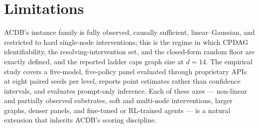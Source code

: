 \section{Limitations}
\label{sec:limitations}

ACDB's instance family is fully observed, causally sufficient, linear--Gaussian, and restricted to hard single-node interventions; this is the regime in which CPDAG identifiability, the resolving-intervention set, and the closed-form random floor are exactly defined, and the reported ladder caps graph size at $d = 14$. The empirical study covers a five-model, five-policy panel evaluated through proprietary APIs at eight paired seeds per level, reports point estimates rather than confidence intervals, and evaluates prompt-only inference. Each of these axes --- non-linear and partially observed substrates, soft and multi-node interventions, larger graphs, denser panels, and fine-tuned or RL-trained agents --- is a natural extension that inherits ACDB's scoring discipline.
